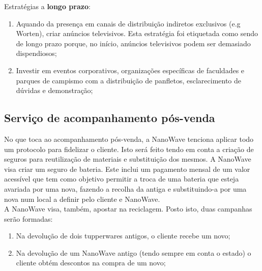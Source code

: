 \documentclass[a4paper]{article}
\begin{document}
Estratégias a \textbf{longo prazo}:
\begin{enumerate}
    \item Aquando da presença em canais de distribuição indiretos exclusivos (e.g Worten), criar anúncios televisivos. Esta estratégia foi etiquetada como sendo de longo prazo porque, no início, anúncios televisivos podem ser demasiado dispendiosos;
    \item Investir em eventos corporativos, organizações específicas de faculdades e parques de campismo com a distribuição de panfletos, esclarecimento de dúvidas e demonstração;
\end{enumerate}

\subsection{Serviço de acompanhamento pós-venda}
No que toca ao acompanhamento pós-venda, a NanoWave tenciona aplicar todo um protocolo para fidelizar o cliente. Isto será feito tendo em conta a criação de seguros para reutilização de materiais e substituição dos mesmos. A NanoWave visa criar um seguro de bateria. Este inclui um pagamento mensal de um valor acessível que tem como objetivo permitir a troca de uma bateria que esteja avariada por uma nova, fazendo a recolha da antiga e substituindo-a por uma nova num local a definir pelo cliente e NanoWave.\\
A NanoWave visa, também, apostar na reciclagem. Posto isto, duas campanhas serão formadas:
\begin{enumerate}
    \item Na devolução de dois tupperwares antigos, o cliente recebe um novo;
    \item Na devolução de um NanoWave antigo (tendo sempre em conta o estado) o cliente obtém descontos na compra de um novo;
\end{enumerate}
\end{document}
